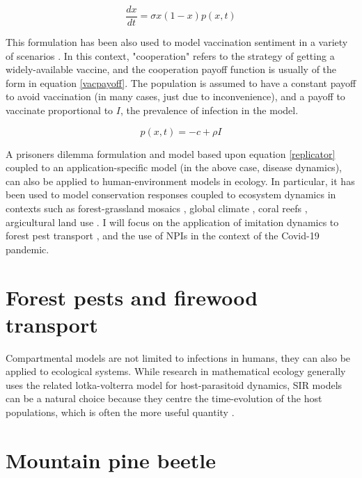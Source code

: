 \begin{equation}
    \frac{dx}{dt} = \sigma x(1 - x)p(x,t) 
    \label{replicator}
\end{equation}


This formulation has been also used to model vaccination sentiment in a variety of scenarios \cite{oraby2014influence,bauch2004vaccination,bauch2005imitation,bauch2012evolutionary}. In this context, "cooperation" refers to the strategy of getting a widely-available vaccine, and the cooperation payoff function is usually of the form in equation \ref{vacpayoff}. The population is assumed to have a constant payoff to avoid vaccination (in many cases, just due to inconvenience), and a payoff to vaccinate proportional to $I$, the prevalence of infection in the model. 

\begin{equation}
    p(x,t) = - c + \rho I
    \label{vacpayoff}
\end{equation}


A prisoners dilemma formulation and model based upon equation \ref{replicator} coupled to an application-specific model (in the above case, disease dynamics), can also be applied to human-environment models in ecology. In particular, it has been used to model conservation responses coupled to ecosystem dynamics in contexts such as forest-grassland mosaics \cite{innes2013impact,henderson2016alternative}, global climate \cite{bury2019charting}, coral reefs \cite{thampi2018socio}, argicultural land use \cite{gooding2018forest}. I will focus on the application of imitation dynamics to forest pest transport \cite{barlow2014modelling}, and the use of NPIs in the context of the Covid-19 pandemic. 


\section{Forest pests and firewood transport}

Compartmental models are not limited to infections in humans, they can also be applied to ecological systems. While research in mathematical ecology generally uses the related lotka-volterra model for host-parasitoid dynamics, SIR models can be a natural choice because they centre the time-evolution of the host populations, which is often the more useful quantity \cite{edelstein2005mathematical}. 


\section{Mountain pine beetle}


